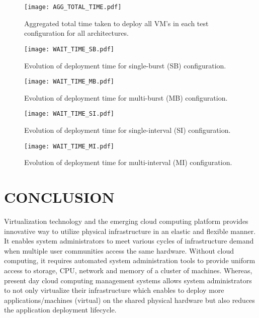 \documentclass[acus]{JAC2003}
\begin{document}
\begin{figure}[htb]
   \centering
   \texttt{[image: AGG\_TOTAL\_TIME.pdf]}
   \caption{Aggregated total time taken to deploy all VM's in each test configuration for all architectures.}
   \label{totaltime}
\end{figure}

\begin{figure}[htb]
   \centering
   \texttt{[image: WAIT\_TIME\_SB.pdf]}
   \caption{Evolution of deployment time for single-burst (SB) configuration.}
   \label{wait_sb}
\end{figure}

\begin{figure}[htb]
   \centering
   \texttt{[image: WAIT\_TIME\_MB.pdf]}
   \caption{Evolution of deployment time for multi-burst (MB) configuration.}
   \label{wait_mb}
\end{figure}

\begin{figure}[htb]
   \centering
   \texttt{[image: WAIT\_TIME\_SI.pdf]}
   \caption{Evolution of deployment time for single-interval (SI) configuration.}
   \label{wait_si}
\end{figure}

\begin{figure}[htb]
   \centering
   \texttt{[image: WAIT\_TIME\_MI.pdf]}
   \caption{Evolution of deployment time for multi-interval (MI) configuration.}
   \label{wait_mi}
\end{figure}





\section{CONCLUSION}

Virtualization technology and the emerging cloud computing platform provides innovative way to utilize physical infrastructure in an elastic and flexible manner. It enables system administrators to meet various cycles of infrastructure demand when multiple user communities access the same hardware. Without cloud computing, it requires automated system administration tools to provide uniform access to storage, CPU, network and memory of a cluster of machines. Whereas, present day cloud computing management systems allows system administrators to not only virtualize their infrastructure which enables to deploy more applications/machines (virtual) on the shared physical hardware but also reduces the application deployment lifecycle.
 
\end{document}
